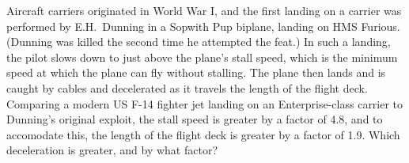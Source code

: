 Aircraft carriers originated in World War I, and the first landing on a carrier was performed by
E.H.~Dunning in a Sopwith Pup biplane, landing on HMS Furious. (Dunning was killed the second time he
attempted the feat.) In such a landing, the pilot slows down to just above the plane's stall speed,
which is the minimum speed at which the plane can fly without stalling. The plane then lands and is caught by
cables and decelerated as it travels the length of the flight deck.
Comparing a modern US F-14 fighter
jet landing on an Enterprise-class carrier to Dunning's original exploit, the stall speed is greater
by a factor of 4.8, and to accomodate this, the length of the flight deck is greater by a factor of 1.9.
Which deceleration is greater, and by what factor?\answercheck
